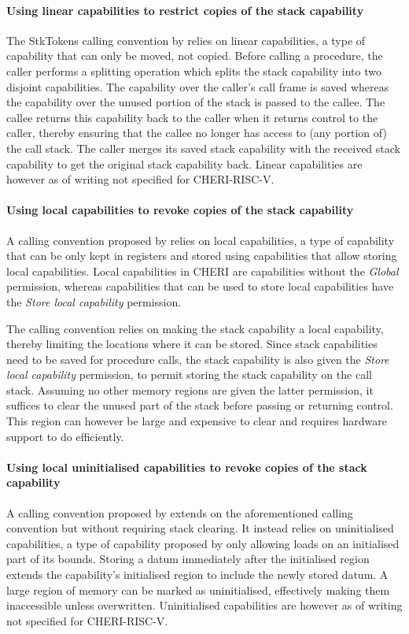 \documentclass[main.tex]{subfiles}
\begin{document}
\paragraph{Using linear capabilities to restrict copies of the stack capability} The StkTokens calling convention by \cite{stktokens} relies on linear capabilities, a type of capability that can only be moved, not copied. Before calling a procedure, the caller performs a splitting operation which splits the stack capability into two disjoint capabilities. The capability over the caller's call frame is saved whereas the capability over the unused portion of the stack is passed to the callee. The callee returns this capability back to the caller when it returns control to the caller, thereby ensuring that the callee no longer has access to (any portion of) the call stack. The caller merges its saved stack capability with the received stack capability to get the original stack capability back. Linear capabilities are however as of writing not specified for CHERI-RISC-V.

\paragraph{Using local capabilities to revoke copies of the stack capability} A calling convention proposed by \cite{retptr} relies on local capabilities, a type of capability that can be only kept in registers and stored using capabilities that allow storing local capabilities. Local capabilities in CHERI are capabilities without the \emph{Global} permission, whereas capabilities that can be used to store local capabilities have the \emph{Store local capability} permission.

The calling convention relies on making the stack capability a local capability, thereby limiting the locations where it can be stored. Since stack capabilities need to be saved for procedure calls, the stack capability is also given the \emph{Store local capability} permission, to permit storing the stack capability on the call stack. Assuming no other memory regions are given the latter permission, it suffices to clear the unused part of the stack before passing or returning control. This region can however be large and expensive to clear and requires hardware support to do efficiently.

\paragraph{Using local uninitialised capabilities to revoke copies of the stack capability} A calling convention proposed by \cite{uninitcaps} extends on the aforementioned calling convention but without requiring stack clearing. It instead relies on uninitialised capabilities, a type of capability proposed by \cite{uninitcapss} only allowing loads on an initialised part of its bounds. Storing a datum immediately after the initialised region extends the capability's initialised region to include the newly stored datum. A large region of memory can be marked as uninitialised, effectively making them inaccessible unless overwritten. Uninitialised capabilities are however as of writing not specified for CHERI-RISC-V.
\end{document}
